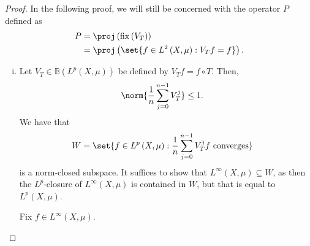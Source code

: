 \documentclass[10pt]{mypackage}
\begin{document}
\begin{proof}
  In the following proof, we will still be concerned with the operator $P$ defined as
  \begin{align*}
    P &= \proj\left( \operatorname{fix}\left( V_T \right) \right)\\
      &= \proj\left( \set{f\in L^2\left( X,\mu \right) : V_Tf = f} \right).
  \end{align*}
  \begin{enumerate}[(i)]
    \item Let $V_T\in \mathbb{B}\left( L^p\left( X,\mu \right) \right)$ be defined by $V_Tf = f\circ T$. Then,
      \begin{align*}
        \norm{\frac{1}{n}\sum_{j=0}^{n-1}V_T^{j}} &\leq 1.
      \end{align*}
      We have that
      \begin{align*}
        W &= \set{f\in L^p\left( X,\mu \right) : \frac{1}{n}\sum_{j=0}^{n-1}V_T^{j}f\text{ converges}}
      \end{align*}
      is a norm-closed subspace. It suffices to show that $L^{\infty}\left( X,\mu \right)\subseteq W$, as then the $L^p$-closure of $L^{\infty}\left( X,\mu \right)$ is contained in $W$, but that is equal to $L^{p}\left( X,\mu \right)$.

      Fix $f\in L^{\infty}\left( X,\mu \right)$.


\end{enumerate}
\end{proof}
\end{document}
